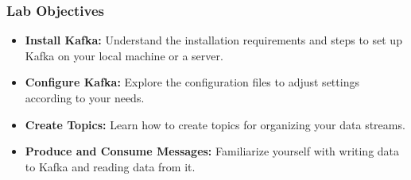 \documentclass[aspectratio=169]{beamer}
\begin{document}
\begin{frame}[fragile]
    \frametitle{Lab Objectives}
    \begin{itemize}
        \item \textbf{Install Kafka:} Understand the installation requirements and steps to set up Kafka on your local machine or a server.
        \item \textbf{Configure Kafka:} Explore the configuration files to adjust settings according to your needs.
        \item \textbf{Create Topics:} Learn how to create topics for organizing your data streams.
        \item \textbf{Produce and Consume Messages:} Familiarize yourself with writing data to Kafka and reading data from it.
    \end{itemize}
\end{frame}
\end{document}
